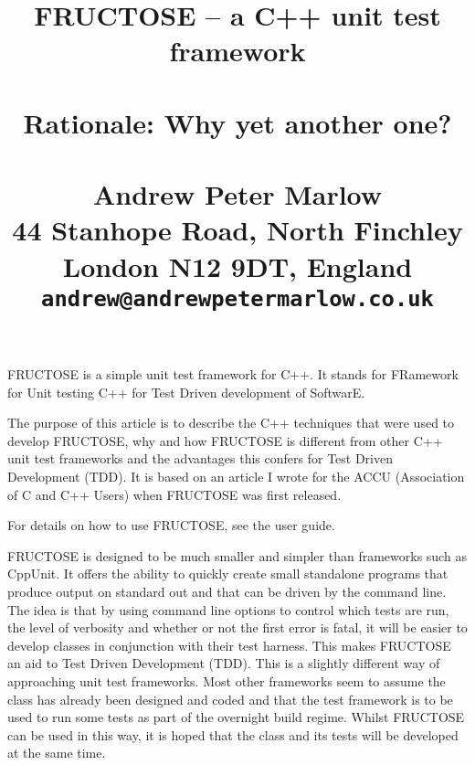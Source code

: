 \documentclass{book}
\begin{document}
 
\title{FRUCTOSE -- a C++ unit test framework \\
\hfil\break \\
Rationale: Why yet another one?\\
\hfil\break \\
Andrew Peter Marlow \\
44 Stanhope Road, North Finchley \\ 
London N12 9DT, England \\ 
{\tt andrew@andrewpetermarlow.co.uk}} 
\maketitle 
% 

\tableofcontents

\vfil\eject




FRUCTOSE is a simple unit test framework for C++. 
It stands for FRamework for Unit testing C++ for Test Driven
development of SoftwarE.

The purpose of this article is to describe the C++ techniques that
were used to develop FRUCTOSE, why and how FRUCTOSE is different
from other C++ unit test frameworks and the advantages this confers
for Test Driven Development (TDD).
It is based on an article I wrote for the ACCU (Association of C and
C++ Users) when FRUCTOSE was first released.

For details on how to use FRUCTOSE, see the user guide.

FRUCTOSE is designed to be much smaller and simpler than frameworks such as
CppUnit. It offers the ability to quickly create small standalone programs that
produce output on standard out and that can be  driven by the command line. 
The idea is that by using command line options
to control which tests are run, the level of verbosity and whether or not
the first error is fatal, it will be easier to develop classes in conjunction
with their test harness. This makes FRUCTOSE an aid to Test Driven
Development (TDD).
This is a slightly different way of approaching unit test frameworks.
Most other frameworks seem to assume the class has already been designed
and coded and that the test framework is to be used to run some tests as
part of the overnight build regime. Whilst FRUCTOSE can be used in this way,
it is hoped that the class and its tests will be developed at the same time.
\end{document}

